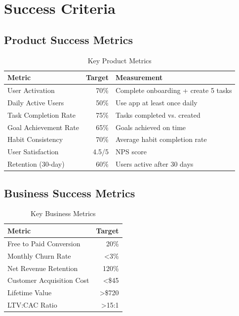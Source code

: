 \section{Success Criteria}

\subsection{Product Success Metrics}

\begin{table}[H]
\centering
\caption{Key Product Metrics}
\begin{tabular}{|l|r|p{6cm}|}
\hline
\rowcolor{lightgray}
\textbf{Metric} & \textbf{Target} & \textbf{Measurement} \\
\hline
User Activation & 70\% & Complete onboarding + create 5 tasks \\
\hline
Daily Active Users & 50\% & Use app at least once daily \\
\hline
Task Completion Rate & 75\% & Tasks completed vs. created \\
\hline
Goal Achievement Rate & 65\% & Goals achieved on time \\
\hline
Habit Consistency & 70\% & Average habit completion rate \\
\hline
User Satisfaction & 4.5/5 & NPS score \\
\hline
Retention (30-day) & 60\% & Users active after 30 days \\
\hline
\end{tabular}
\end{table}

\subsection{Business Success Metrics}

\begin{table}[H]
\centering
\caption{Key Business Metrics}
\begin{tabular}{|l|r|}
\hline
\rowcolor{lightgray}
\textbf{Metric} & \textbf{Target} \\
\hline
Free to Paid Conversion & 20\% \\
\hline
Monthly Churn Rate & <3\% \\
\hline
Net Revenue Retention & 120\% \\
\hline
Customer Acquisition Cost & <\$45 \\
\hline
Lifetime Value & >\$720 \\
\hline
LTV:CAC Ratio & >15:1 \\
\hline
\end{tabular}
\end{table}

